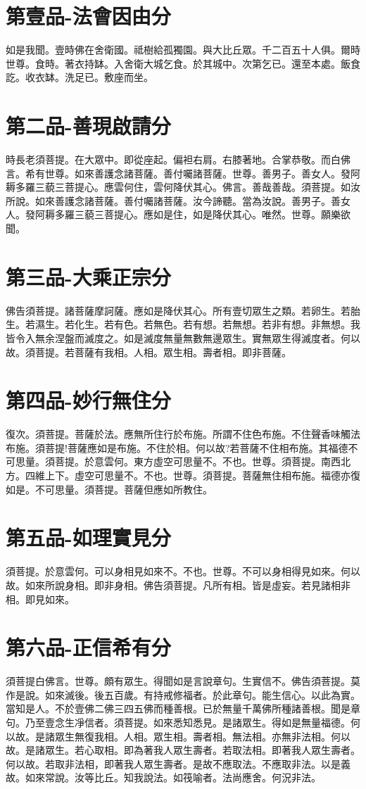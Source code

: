 \documentclass[a6paper, 22pt, twocolumn]{cvertbook}
\begin{document}
\inmain


\chapter{第壹品-法會因由分}
\large 如是我聞。壹時佛在舍衛國。祗樹給孤獨園。與大比丘眾。千二百五十人俱。爾時世尊。食時。著衣持缽。入舍衛大城乞食。於其城中。次第乞已。還至本處。飯食訖。收衣缽。洗足已。敷座而坐。
\chapter{第二品-善現啟請分}
\large 時長老須菩提。在大眾中。即從座起。偏袒右肩。右膝著地。合掌恭敬。而白佛言。希有世尊。如來善護念諸菩薩。善付囑諸菩薩。世尊。善男子。善女人。發阿耨多羅三藐三菩提心。應雲何住，雲何降伏其心。佛言。善哉善哉。須菩提。如汝所說。如來善護念諸菩薩。善付囑諸菩薩。汝今諦聽。當為汝說。善男子。善女人。發阿耨多羅三藐三菩提心。應如是住，如是降伏其心。唯然。世尊。願樂欲聞。
\chapter{第三品-大乘正宗分}
\large 佛告須菩提。諸菩薩摩訶薩。應如是降伏其心。所有壹切眾生之類。若卵生。若胎生。若濕生。若化生。若有色。若無色。若有想。若無想。若非有想。非無想。我皆令入無余涅盤而滅度之。如是滅度無量無數無邊眾生。實無眾生得滅度者。何以故。須菩提。若菩薩有我相。人相。眾生相。壽者相。即非菩薩。
\chapter{第四品-妙行無住分}
\large 復次。須菩提。菩薩於法。應無所住行於布施。所謂不住色布施。不住聲香味觸法布施。須菩提!菩薩應如是布施。不住於相。何以故?若菩薩不住相布施。其福德不可思量。須菩提。於意雲何。東方虛空可思量不。不也。世尊。須菩提。南西北方。四維上下。虛空可思量不。不也。世尊。須菩提。菩薩無住相布施。福德亦復如是。不可思量。須菩提。菩薩但應如所教住。
\chapter{第五品-如理實見分}
\large 須菩提。於意雲何。可以身相見如來不。不也。世尊。不可以身相得見如來。何以故。如來所說身相。即非身相。佛告須菩提。凡所有相。皆是虛妄。若見諸相非相。即見如來。
\chapter{第六品-正信希有分}
\large 須菩提白佛言。世尊。頗有眾生。得聞如是言說章句。生實信不。佛告須菩提。莫作是說。如來滅後。後五百歲。有持戒修福者。於此章句。能生信心。以此為實。當知是人。不於壹佛二佛三四五佛而種善根。已於無量千萬佛所種諸善根。聞是章句。乃至壹念生凈信者。須菩提。如來悉知悉見。是諸眾生。得如是無量福德。何以故。是諸眾生無復我相。人相。眾生相。壽者相。無法相。亦無非法相。何以故。是諸眾生。若心取相。即為著我人眾生壽者。若取法相。即著我人眾生壽者。何以故。若取非法相，即著我人眾生壽者。是故不應取法。不應取非法。以是義故。如來常說。汝等比丘。知我說法。如筏喻者。法尚應舍。何況非法。
\end{document}
